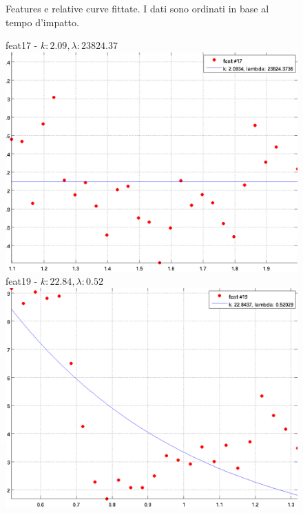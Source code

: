 \documentclass[12pt]{report}
\begin{document}
\begin{figure}[H]
\begin{minipage}[t]{0.5\linewidth}
\end{minipage}
\caption[short]{Features e relative curve fittate. I dati sono ordinati in base al tempo d'impatto.}
\label{fig:feats3}
\end{figure}

\begin{figure}[H]
\begin{minipage}[t]{0.5\linewidth}
	\centering
	feat17 - $k: 2.09, \lambda: 23824.37 $\\
	\includegraphics[scale=\imFeat]{images/feat17}\\
	feat19 - $k: 22.84, \lambda: 0.52 $\\
	\includegraphics[scale=\imFeat]{images/feat19}\\

\end{minipage}
\end{figure}
\end{document}
